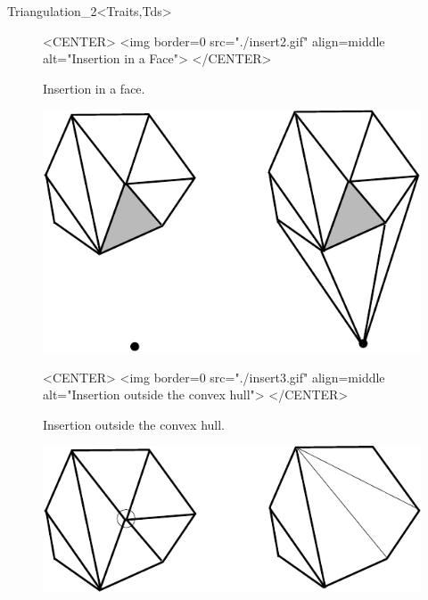 \begin{ccRefClass}{Triangulation_2<Traits,Tds>}
\begin{figure}
\begin{ccHtmlOnly}
<CENTER>
<img border=0 src="./insert2.gif" align=middle alt="Insertion in a Face">
</CENTER>
\end{ccHtmlOnly}

\caption{Insertion in a face.
\label{Triangulation_ref_Fig_insert2}}

\end{figure}


\begin{figure}
\begin{ccTexOnly}
\begin{center}
\includegraphics{Triangulation_2/insert3}
\end{center}
\end{ccTexOnly}


\begin{ccHtmlOnly}
<CENTER>
<img border=0 src="./insert3.gif" align=middle alt="Insertion outside the
convex hull">
</CENTER>
\end{ccHtmlOnly}

\caption{Insertion outside the convex hull.
\label{Triangulation_ref_Fig_insert3}}
\end{figure}

\begin{figure}
\begin{ccTexOnly}
\begin{center}
\includegraphics{Triangulation_2/remove}
\end{center}
\end{ccTexOnly}


\end{figure}
\end{ccRefClass}
